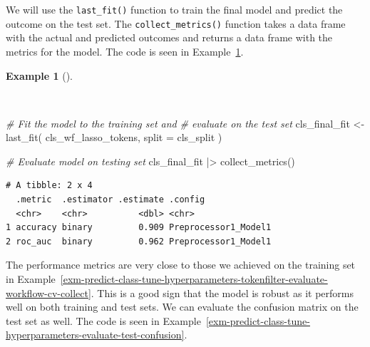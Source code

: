 \documentclass[
  letterpaper,
]{latex/krantz}
\newenvironment{Shaded}{\begin{snugshade}}{\end{snugshade}}
\newcommand{\AttributeTok}[1]{\textcolor[rgb]{0.00,0.00,0.00}{#1}}
\newcommand{\CommentTok}[1]{\textcolor[rgb]{0.00,0.00,0.00}{\textit{#1}}}
\newcommand{\FunctionTok}[1]{\textcolor[rgb]{0.00,0.00,0.00}{#1}}
\newcommand{\NormalTok}[1]{\textcolor[rgb]{0.00,0.00,0.00}{#1}}
\newcommand{\OtherTok}[1]{\textcolor[rgb]{0.00,0.00,0.00}{#1}}
\newcommand{\SpecialCharTok}[1]{\textcolor[rgb]{0.00,0.00,0.00}{#1}}
\theoremstyle{definition}
\newtheorem{example}{Example}[chapter]
\theoremstyle{remark}
\begin{document}
We will use the \texttt{last\_fit()} function to train the final model
and predict the outcome on the test set. The \texttt{collect\_metrics()}
function takes a data frame with the actual and predicted outcomes and
returns a data frame with the metrics for the model. The code is seen in
Example~\ref{exm-predict-class-tune-hyperparameters-evaluate-test}.

\begin{example}[]\protect\hypertarget{exm-predict-class-tune-hyperparameters-evaluate-test}{}\label{exm-predict-class-tune-hyperparameters-evaluate-test}

~

\begin{Shaded}
\begin{Highlighting}[]
\CommentTok{\# Fit the model to the training set and}
\CommentTok{\# evaluate on the test set}
\NormalTok{cls\_final\_fit }\OtherTok{\textless{}{-}}
  \FunctionTok{last\_fit}\NormalTok{(}
\NormalTok{    cls\_wf\_lasso\_tokens,}
    \AttributeTok{split =}\NormalTok{ cls\_split}
\NormalTok{  )}

\CommentTok{\# Evaluate model on testing set}
\NormalTok{cls\_final\_fit }\SpecialCharTok{|\textgreater{}}
  \FunctionTok{collect\_metrics}\NormalTok{()}
\end{Highlighting}
\end{Shaded}

\begin{verbatim}
# A tibble: 2 x 4
  .metric  .estimator .estimate .config             
  <chr>    <chr>          <dbl> <chr>               
1 accuracy binary         0.909 Preprocessor1_Model1
2 roc_auc  binary         0.962 Preprocessor1_Model1
\end{verbatim}

\end{example}

The performance metrics are very close to those we achieved on the
training set in
Example~\ref{exm-predict-class-tune-hyperparameters-tokenfilter-evaluate-workflow-cv-collect}.
This is a good sign that the model is robust as it performs well on both
training and test sets. We can evaluate the confusion matrix on the test
set as well. The code is seen in
Example~\ref{exm-predict-class-tune-hyperparameters-evaluate-test-confusion}.
\end{document}
